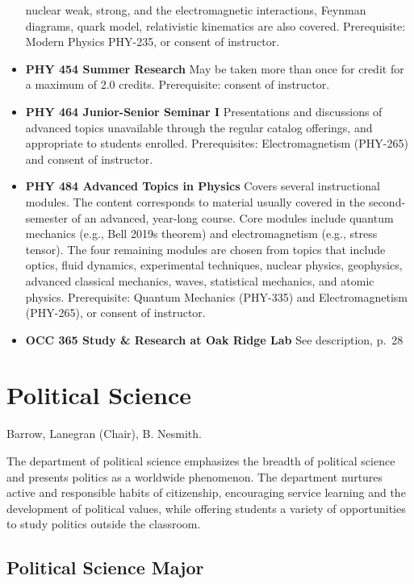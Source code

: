 \documentclass[
  letterpaper,
]{scrbook}
\begin{document}
\begin{itemize}
  nuclear weak, strong, and the electromagnetic interactions, Feynman
  diagrams, quark model, relativistic kinematics are also covered.
  Prerequisite: Modern Physics PHY-235, or consent of instructor.
\item
  \textbf{PHY 454 Summer Research} May be taken more than once for
  credit for a maximum of 2.0 credits. Prerequisite: consent of
  instructor.
\item
  \textbf{PHY 464 Junior-Senior Seminar I} Presentations and discussions
  of advanced topics unavailable through the regular catalog offerings,
  and appropriate to students enrolled. Prerequisites: Electromagnetism
  (PHY-265) and consent of instructor.
\item
  \textbf{PHY 484 Advanced Topics in Physics} Covers several
  instructional modules. The content corresponds to material usually
  covered in the second-semester of an advanced, year-long course. Core
  modules include quantum mechanics (e.g., Bell 2019s theorem) and
  electromagnetism (e.g., stress tensor). The four remaining modules are
  chosen from topics that include optics, fluid dynamics, experimental
  techniques, nuclear physics, geophysics, advanced classical mechanics,
  waves, statistical mechanics, and atomic physics. Prerequisite:
  Quantum Mechanics (PHY-335) and Electromagnetism (PHY-265), or consent
  of instructor.
\item
  \textbf{OCC 365 Study \& Research at Oak Ridge Lab} See description,
  p.~28
\end{itemize}

\hypertarget{political-science}{%
\section{Political Science}\label{political-science}}

Barrow, Lanegran (Chair), B. Nesmith.

The department of political science emphasizes the breadth of political
science and presents politics as a worldwide phenomenon. The department
nurtures active and responsible habits of citizenship, encouraging
service learning and the development of political values, while offering
students a variety of opportunities to study politics outside the
classroom.

\hypertarget{political-science-major}{%
\subsection{Political Science Major}\label{political-science-major}}
\end{document}
